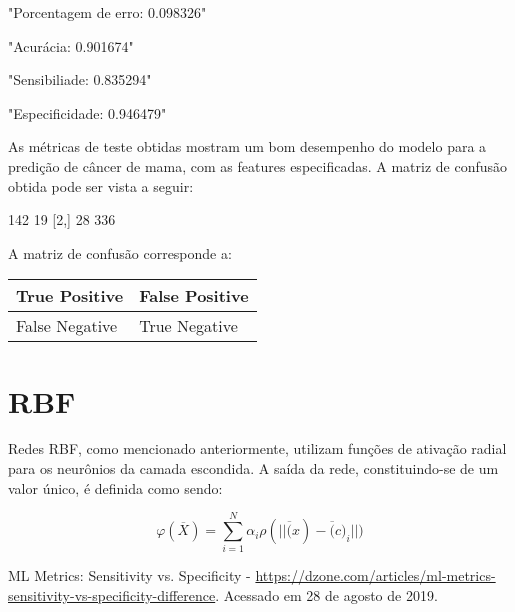 \documentclass{article}
\begin{document}
\begin{Schunk}
\begin{Soutput}
[1] "Porcentagem de erro: 0.098326"
\end{Soutput}
\begin{Soutput}
[1] "Acurácia: 0.901674"
\end{Soutput}
\begin{Soutput}
[1] "Sensibiliade: 0.835294"
\end{Soutput}
\begin{Soutput}
[1] "Especificidade: 0.946479"
\end{Soutput}
\end{Schunk}

As métricas de teste obtidas mostram um bom desempenho do modelo para a predição de câncer de mama, com as features especificadas. A matriz de confusão obtida pode ser vista a seguir:

\begin{Schunk}
\begin{Soutput}
     [,1] [,2]
[1,]  142   19
[2,]   28  336
\end{Soutput}
\end{Schunk}

A matriz de confusão corresponde a:

\begin{table}[H]
\begin{tabular}{|l|l|}
\hline
True Positive & False Positive \\ \hline
False Negative & True Negative \\ \hline
\end{tabular}
\end{table}

\section{RBF}

Redes RBF, como mencionado anteriormente, utilizam funções de ativação radial para os neurônios da camada escondida. A saída da rede, constituindo-se de um valor único, é definida como sendo:

\begin{equation}
\varphi(\overline{X}) = \sum^{N}_{i=1} \alpha_i \rho(|| \overline(x) - \overline(c)_i ||)
\end{equation}





\begin{thebibliography}{1}

	ML Metrics: Sensitivity vs. Specificity -
	\url{https://dzone.com/articles/ml-metrics-sensitivity-vs-specificity-difference}.
	Acessado em 28 de agosto de 2019.


\end{thebibliography}
\end{document}
